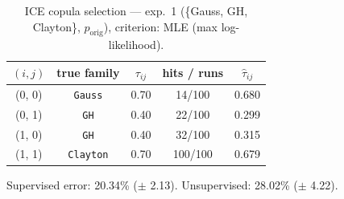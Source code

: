 \begin{table}[htbp]
  \centering
  \caption{ICE copula selection — exp.\ 1 (\{Gauss, GH, Clayton\}, $p_{\text{orig}}$), criterion: MLE (max log-likelihood).}
  \label{tab:exp3-exp1_orig_p__mle}
  \begin{tabular}{ccccc}
    \toprule
    $(i, j)$ & true family & $\tau_{ij}$ & hits / runs & $\hat\tau_{ij}$ \\
    \midrule
    (0, 0) & \texttt{Gauss} & 0.70 & 14/100 & 0.680 \\
    (0, 1) & \texttt{GH} & 0.40 & 22/100 & 0.299 \\
    (1, 0) & \texttt{GH} & 0.40 & 32/100 & 0.315 \\
    (1, 1) & \texttt{Clayton} & 0.70 & 100/100 & 0.679 \\
    \bottomrule
  \end{tabular}
  \par\smallskip Supervised error: 20.34\% ($\pm$ 2.13). Unsupervised: 28.02\% ($\pm$ 4.22).
\end{table}
